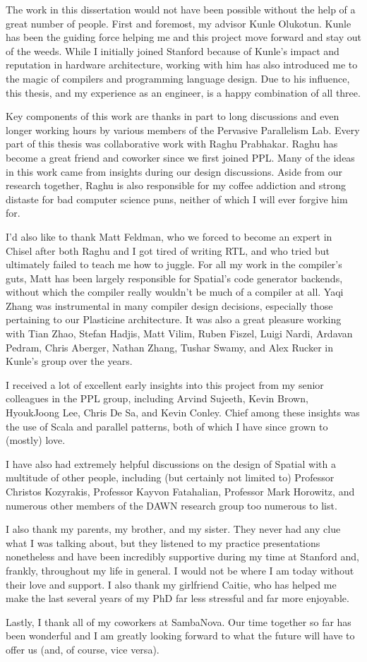 The work in this dissertation would not have been possible without the help of
a great number of people. First and foremost, my advisor Kunle Olukotun.
Kunle has been the guiding force helping me and this
project move forward and stay out of the weeds. While I initially joined Stanford
because of Kunle's impact and reputation in hardware architecture, working with him
has also introduced me to the magic of compilers and programming language design.
Due to his influence, this thesis, and my experience as an engineer, is a
happy combination of all three.

Key components of this work are thanks in part to long discussions and even longer
working hours by various members of the Pervasive Parallelism Lab.
Every part of this thesis was collaborative work with Raghu Prabhakar.
Raghu has become a great friend and coworker since we first joined PPL. Many of
the ideas in this work came from insights during our design discussions.
Aside from our research together, Raghu is also responsible for my
coffee addiction and strong distaste for bad computer science puns, neither of
which I will ever forgive him for.

I'd also like to thank Matt Feldman, who we forced to become an expert in Chisel
after both Raghu and I got tired of writing RTL,
and who tried but ultimately failed to teach me how to juggle.
For all my work in the compiler's guts, Matt has been largely
responsible for Spatial's code generator backends, without which the
compiler really wouldn't be much of a compiler at all.
Yaqi Zhang was instrumental in many compiler design decisions, especially those
pertaining to our Plasticine architecture.
It was also a great pleasure working with Tian Zhao, Stefan Hadjis, Matt Vilim,
Ruben Fiszel, Luigi Nardi, Ardavan Pedram, Chris Aberger, Nathan Zhang,
Tushar Swamy, and Alex Rucker in Kunle's group over the years.

I received a lot of excellent early insights into this project from my senior
colleagues in the PPL group, including Arvind Sujeeth, Kevin Brown, HyoukJoong
Lee, Chris De Sa, and Kevin Conley. Chief among these insights was the use of
Scala and parallel patterns, both of which I have since grown to (mostly) love.

I have also had extremely helpful discussions on the design of Spatial
with a multitude of other people, including (but certainly not limited to)
Professor Christos Kozyrakis, Professor Kayvon Fatahalian, Professor Mark Horowitz,
and numerous other members of the DAWN research group too numerous to list.

I also thank my parents, my brother, and my sister. They never had any
clue what I was talking about, but they listened to my practice presentations
nonetheless and have been incredibly supportive during my time at Stanford and,
frankly, throughout my life in general. I would not be where I am today without
their love and support. I also thank my girlfriend Caitie, who has helped me
make the last several years of my PhD far less stressful and far more enjoyable.

Lastly, I thank all of my coworkers at SambaNova. Our time
together so far has been wonderful and I am greatly looking forward to what
the future will have to offer us (and, of course, vice versa).
